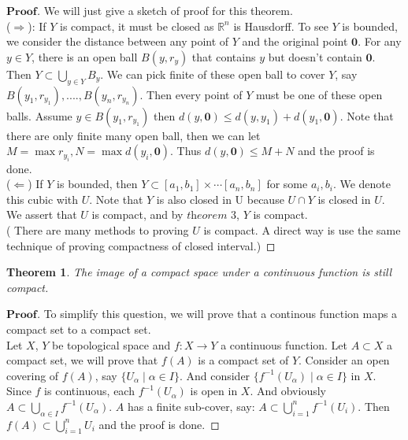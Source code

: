 \documentclass[a4paper, 11pt]{article}
\newtheorem{theorem}{Theorem}
\theoremstyle{definition}
\theoremstyle{remark}
\newenvironment{myprf}
{\renewcommand\qedsymbol{$ $}\begin{proof}[$\mathbf{Proof}$]}
  {\end{proof}}
\theoremstyle{definition}
\begin{document}
\begin{myprf}
        We will just give a sketch of proof for this theorem.\\
        ($\Rightarrow$): If $Y$ is compact, it must be closed as $\mathbb{R}^n$
        is Hausdorff. To see $Y$ is bounded, we consider the distance between any
        point of $Y$ and the original point $\mathbf{0}$. 
        For any $y\in Y$, there is an open
        ball $B(y, r_y)$ that contains $y$ but doesn't contain $\mathbf{0}$. Then 
        $Y\subset\bigcup_{y\in Y} B_y$. We can pick finite of these open ball to
        cover $Y$, say $B(y_1,r_{y_1}),....,B(y_n,r_{y_n})$. 
        Then every point of $Y$ must be
        one of these open balls. Assume $y\in B(y_1,r_{y_1})$ then 
        $d(y,\mathbf{0})\leq d(y, y_1)+d(y_1, \mathbf{0})$. Note that there are
        only finite many open ball, then we can let $M=\max r_{y_i}, N=
        \max d(y_i, \mathbf{0})$. Thus $d(y,\mathbf{0}) \leq M+N$ and the proof
        is done.\\
        \noindent
        ($\Leftarrow$) If $Y$ is bounded, then $Y\subset [a_1,b_1]\times\cdots
        [a_n,b_n]$ for some $a_i, b_i$. We denote this cubic with $U$.
        Note that $Y$ is also closed in U because $U\cap Y$ is closed in $U$.
        We assert that $U$ is compact, and by $\textit{theorem 3}$, $Y$
        is compact.\\
        ( There are many methods to proving $U$ is compact. A direct way
        is use the same technique of proving compactness of closed interval.)
\end{myprf}
\vspace{0.5cm}
\begin{theorem}
        The image of a compact space under a continuous function is still 
        compact.
\end{theorem}
\begin{myprf}
        To simplify this question, we will prove that a continous function maps
        a compact set to a compact set.\\
        \indent Let $X$, $Y$ be topological space and $f:X\rightarrow Y$ a 
        continuous function. Let $A\subset X$ a compact set, we will prove that
        $f(A)$ is a compact set of $Y$. Consider an open covering of $f(A)$, 
        say $\{U_{\alpha}\mid \alpha\in I\}$. And consider $\{f^{-1}(U_{\alpha})
        \mid \alpha\in I\}$ in $X$. Since $f$ is continuous, each 
        $f^{-1}(U_{\alpha})$ is open in $X$. And obviously $\displaystyle 
        A\subset \bigcup_{\alpha\in I}f^{-1}(U_{\alpha})$. $A$ has a finite
        sub-cover, say: $\displaystyle A\subset \bigcup_{i=1}^{n} f^{-1}(U_i)$.
        Then $\displaystyle f(A)\subset \bigcup_{i=1}^{n} U_i$ and the proof is
        done.
\end{myprf}
\end{document}
